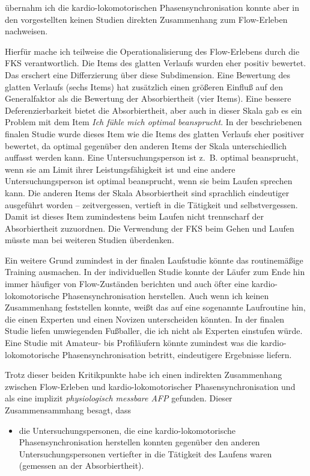 übernahm ich die kardio-lokomotorischen Phasensynchronisation konnte aber in den vorgestellten keinen Studien direkten Zusammenhang zum Flow-Erleben nachweisen.

Hierfür mache ich teilweise die Operationalisierung des Flow-Erlebens durch die \ac{FKS} verantwortlich. Die Items des glatten Verlaufs wurden eher positiv bewertet. Das erschert eine Differzierung über diese Subdimension. Eine Bewertung des glatten Verlaufs (sechs Items) hat zusätzlich einen größeren Einfluß auf den Generalfaktor als die Bewertung der Absorbiertheit (vier Items). Eine bessere Deferenzierbarkeit bietet die Absorbiertheit, aber auch in dieser Skala gab es ein Problem mit dem Item \emph{Ich fühle mich optimal beansprucht}. In der beschriebenen finalen Studie wurde dieses Item wie die Items des glatten Verlaufs eher positiver bewertet, da optimal gegenüber den anderen Items der Skala unterschiedlich auffasst werden kann. Eine Untersuchungsperson ist z.~B. optimal beansprucht, wenn sie am Limit ihrer Leistungsfähigkeit ist und eine andere Untersuchungsperson ist optimal beansprucht, wenn sie beim Laufen sprechen kann. Die anderen Items der Skala Absorbiertheit sind sprachlich eindeutiger ausgeführt worden -- zeitvergessen, vertieft in die Tätigkeit und selbstvergessen. Damit ist dieses Item zumindestens beim Laufen nicht trennscharf der Absorbiertheit zuzuordnen. Die Verwendung der \ac{FKS} beim Gehen und Laufen müsste man bei weiteren Studien überdenken.

Ein weitere Grund zumindest in der finalen Laufstudie könnte das routinemäßige Training ausmachen. In der individuellen Studie konnte der Läufer zum Ende hin immer häufiger von Flow-Zuständen berichten und auch öfter eine kardio-lokomotorische Phasensynchronisation herstellen. Auch wenn ich keinen Zusammenhang feststellen konnte, weißt das auf eine sogenannte Laufroutine hin, die einen Experten und einen Novizen unterscheiden könnten. In der finalen Studie liefen umwiegenden Fußballer, die ich nicht als Experten einstufen würde. Eine Studie mit Amateur- bis Profiläufern könnte zumindest was die kardio-lokomotorische Phasensynchronisation betritt, eindeutigere Ergebnisse liefern.

Trotz dieser beiden Kritikpunkte habe ich einen indirekten Zusammenhang zwischen Flow-Erleben und kardio-lokomotorischer Phasensynchronisation und als eine implizit \emph{physiologisch messbare \ac{AFP}} gefunden. Dieser Zusammensammhang besagt, dass 

\begin{itemize}

	\item die Untersuchungspersonen, die eine kardio-lokomotorische Phasensynchronisation herstellen konnten gegenüber den anderen Untersuchungspersonen vertiefter in die Tätigkeit des Laufens waren (gemessen an der Absorbiertheit).

\end{itemize}


